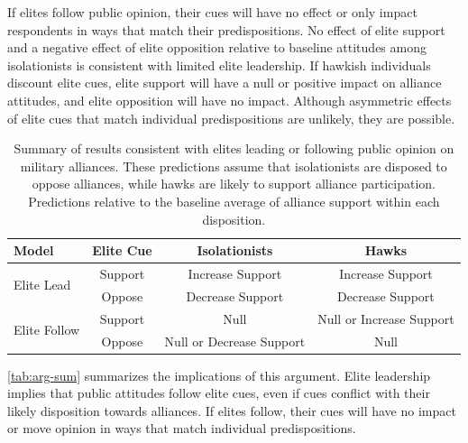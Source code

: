 \documentclass[12pt]{article}
\begin{document}
If elites follow public opinion, their cues will have no effect or only impact respondents in ways that match their predispositions. 
No effect of elite support and a negative effect of elite opposition relative to baseline attitudes among isolationists is consistent with limited elite leadership. 
If hawkish individuals discount elite cues, elite support will have a null or positive impact on alliance attitudes, and elite opposition will have no impact. 
Although asymmetric effects of elite cues that match individual predispositions are unlikely, they are possible. 


\begin{table}[hbt!]
\begin{center}
\begin{tabular}{lccc}
   Model  & Elite Cue & Isolationists & Hawks  \\
\hline
\multirow{2}{*}{Elite Lead} & Support   & Increase Support  &  Increase Support \\
                            & Oppose    & Decrease Support  &  Decrease Support \\

 \hline
\multirow{2}{*}{Elite Follow} & Support   & Null  & Null or Increase Support \\
                              & Oppose    & Null or Decrease Support   &  Null \\
\hline
\end{tabular}
\caption{Summary of results consistent with elites leading or following public opinion on military alliances. These predictions assume that isolationists are disposed to oppose alliances, while hawks are likely to support alliance participation. Predictions relative to the baseline average of alliance support within each disposition.}
\label{tab:arg-sum}
\end{center} 
\end{table}


\autoref{tab:arg-sum} summarizes the implications of this argument.  
Elite leadership implies that public attitudes follow elite cues, even if cues conflict with their likely disposition towards alliances. 
If elites follow, their cues will have no impact or move opinion in ways that match individual predispositions. 
\end{document}
